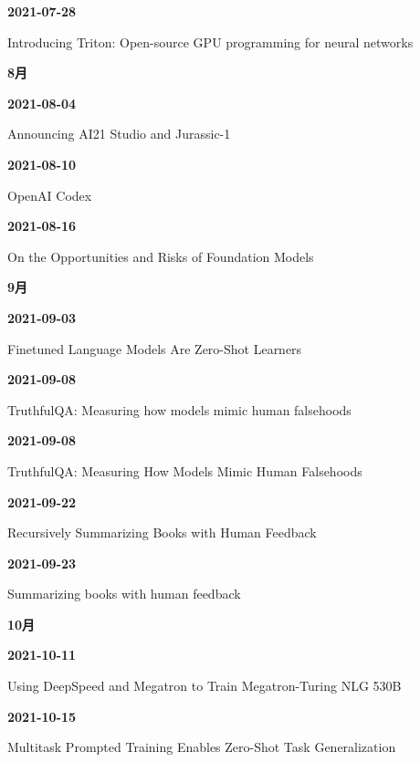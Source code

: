 \smallskip
\noindent\textbf{2021-07-28}\par
{\raggedright Introducing Triton: Open-source GPU programming for neural networks\,\cite{chron-03e8feb802d3}\par}
\smallskip
\medskip
\noindent\textbf{8月}\par
\smallskip
\noindent\textbf{2021-08-04}\par
{\raggedright Announcing AI21 Studio and Jurassic-1\,\cite{src-bf581c89a17f}\par}
\smallskip
\noindent\textbf{2021-08-10}\par
{\raggedright OpenAI Codex\,\cite{src-5a992319f41e}\par}
\smallskip
\noindent\textbf{2021-08-16}\par
{\raggedright On the Opportunities and Risks of Foundation Models\,\cite{src-d9549fe4ff37}\par}
\smallskip
\medskip
\noindent\textbf{9月}\par
\smallskip
\noindent\textbf{2021-09-03}\par
{\raggedright Finetuned Language Models Are Zero-Shot Learners\,\cite{src-8b2f7c40f4a4}\par}
\smallskip
\noindent\textbf{2021-09-08}\par
{\raggedright TruthfulQA: Measuring how models mimic human falsehoods\,\cite{src-c16f4ae139bf}\par}
\smallskip
\noindent\textbf{2021-09-08}\par
{\raggedright TruthfulQA: Measuring How Models Mimic Human Falsehoods\,\cite{src-8536f9ceae6d}\par}
\smallskip
\noindent\textbf{2021-09-22}\par
{\raggedright Recursively Summarizing Books with Human Feedback\,\cite{src-90a37f62aeab}\par}
\smallskip
\noindent\textbf{2021-09-23}\par
{\raggedright Summarizing books with human feedback\,\cite{src-7f768525daf5}\par}
\smallskip
\medskip
\noindent\textbf{10月}\par
\smallskip
\noindent\textbf{2021-10-11}\par
{\raggedright Using DeepSpeed and Megatron to Train Megatron-Turing NLG 530B\,\cite{src-b307b4b82867}\par}
\smallskip
\noindent\textbf{2021-10-15}\par
{\raggedright Multitask Prompted Training Enables Zero-Shot Task Generalization\,\cite{src-6339600396eb}\par}

